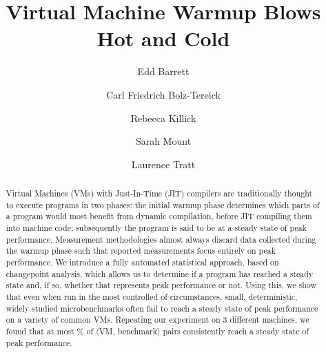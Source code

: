 \documentclass[acmsmall]{acmart}\settopmatter{printfolios=true}
\newcommand{\vmbpair}{$\langle$VM, benchmark$\rangle$\xspace}
\begin{document}
\title{Virtual Machine Warmup Blows Hot and Cold}

\author{Edd Barrett}
\author{Carl Friedrich Bolz-Tereick}
\author{Rebecca Killick}
\author{Sarah Mount}
\author{Laurence Tratt}

%
%
%

\begin{abstract}
Virtual Machines (VMs) with Just-In-Time (JIT) compilers are traditionally thought
to execute programs in two phases: the initial warmup phase determines
which parts of a program would most benefit from dynamic compilation, before JIT
compiling them into machine code; subsequently
the program is said to be at a steady state of peak performance.
Measurement methodologies almost always discard data collected during the warmup
phase such that reported measurements focus entirely on peak performance.
We introduce a fully automated statistical approach, based
on changepoint analysis, which allows us to determine if a program
has reached a steady state and, if so, whether that represents peak
performance or not. Using this, we show that even when run in the
most controlled of circumstances, small, deterministic, widely studied
microbenchmarks often fail to reach a steady state of peak performance on a
variety of common VMs. Repeating our experiment on 3 different machines, we
found that at most \maxtwo\% of
\vmbpair pairs consistently reach a steady state of peak performance.
\end{abstract}
\end{document}
